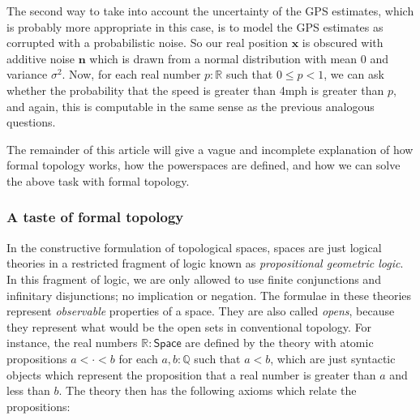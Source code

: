 \documentclass{article}           %
\newcommand{\R}{\mathbb{R}}
\newcommand{\rat}{\mathbb{Q}}
\newcommand{\Space}{\mathsf{Space}}
\newcommand{\ve}[1]{\mathbf{#1}}
\begin{document}
The second way to take into account the uncertainty of the GPS estimates, which is probably more appropriate in this case, is to model the GPS estimates as corrupted with a probabilistic noise. So our real position $\ve{x}$ is obscured with additive noise $\ve{n}$ which is drawn from a normal distribution with mean 0 and variance $\sigma^2$. Now, for each real number $p : \R$ such that $0 \le p < 1$, we can ask whether the probability that the speed is greater than 4mph is greater than $p$, and again, this is computable in the same sense as the previous analogous questions.

The remainder of this article will give a vague and incomplete explanation of how formal topology works, how the powerspaces are defined, and how we can solve the above task with formal topology.

\subsubsection{A taste of formal topology}

In the constructive formulation of topological spaces, spaces are just logical theories in a restricted fragment of logic known as \emph{propositional geometric logic}. In this fragment of logic, we are only allowed to use finite conjunctions and infinitary disjunctions; no implication or negation. The formulae in these theories represent \emph{observable} properties of a space. They are also called \emph{opens}, because they represent what would be the open sets in conventional topology. For instance, the real numbers $\R : \Space$ are defined by the theory with atomic propositions $a < \cdot < b$ for each $a, b : \rat$ such that $a < b$, which are just syntactic objects which represent the proposition that a real number is greater than $a$ and less than $b$. The theory then has the following axioms which relate the propositions:
\end{document}
